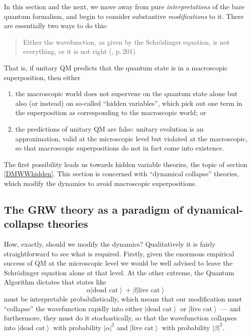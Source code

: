 \documentclass[12pt]{article}
\newcommand{\be}{\begin{equation}}
\newcommand{\ee}{\end{equation}}
\newcommand{\ket}[1]{\ensuremath{\left|  #1 \right\rangle}}
\begin{document}
In this section and the next, we move away from pure \emph{interpretations} of the bare quantum formalism, and begin to consider substantive \emph{modifications} to it. There are essentially two ways to do this:
\begin{quote}
Either the wavefunction, as given by the Schr\"{o}dinger equation, is not everything, or it is not right (, p.\,201)
\end{quote} 
That is, if unitary QM predicts that the quantum state is in a macroscopic superposition, then either 
\begin{enumerate}
\item the macroscopic world does not supervene on the quantum state alone but also (or instead) on so-called ``hidden variables'', which pick out one term in the superposition as corresponding to the macroscopic world; or 
\item the predictions of unitary QM are false: unitary evolution is an approximation, valid at the microscopic level but violated at the macroscopic, so that macroscopic superpositions do not in fact come into existence.
\end{enumerate}
The first possibility leads us towards hidden variable theories, the topic of section \ref{DMWWhidden}. This section is concerned with ``dynamical collapse'' theories, which modify the dynamics  to avoid macroscopic superpositions.

\subsection{The GRW theory as a paradigm of dynamical-collapse theories}\label{DMWWGRW}

How, exactly, should we modify the dynamics? Qualitatively it is fairly straightforward to see what is required. Firstly, given the enormous empirical success of QM at the microscopic level we would be well advised to leave the Schr\"{o}dinger equation alone at that level. At the other extreme, the Quantum Algorithm dictates that states like 
\be \label{DMWWcatagain}\alpha\ket{\mathrm{\mbox{dead cat}}}+\beta \ket{\mathrm{\mbox{live cat}}}\ee
must be interpretable probabilistically, which means that our modification must ``collapse'' the wavefunction rapidly into either \ket{\mathrm{\mbox{dead cat}}} or \ket{\mathrm{\mbox{live cat}}} --- and furthermore, they  must do it stochastically, so that the wavefunction collapses into \ket{\mathrm{\mbox{dead cat}}} with probability $|\alpha|^2$ and \ket{\mathrm{\mbox{live cat}}} with probability $|\beta|^2$.
\end{document}
